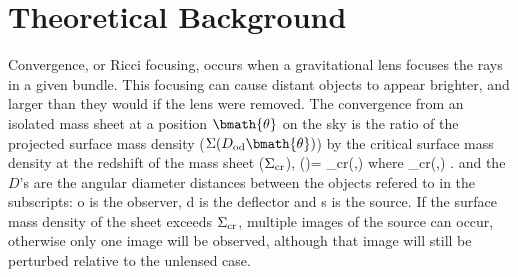 \documentclass[useAMS,usenatbib]{mn2e}
\begin{document}
\section{Theoretical Background}
\label{sec:theory}

Convergence, or Ricci focusing, occurs when a gravitational lens focuses
the rays in a given bundle. This focusing can cause distant objects to
appear brighter, and larger than they would if the lens were removed.
The convergence from an isolated mass sheet at a position
$\bmath{\theta}$ on the sky is the ratio of the projected surface
mass density ($\Sigma(D_{\mathrm{od}}\bmath{\theta})$) \devided by the
critical surface mass density at the redshift of the mass sheet
($\Sigma_{\rm cr}$),
\be
\kappa(\bmath{\theta})= 
                              {\Sigma_{\rm cr}(\zd,\zs)}
\ee
where 
\be 
\label{eq:sigcrit} 
\Sigma_{\rm cr}(\zd,\zs) \equiv {}.
\ee
and the $D$'s are the angular diameter distances between the objects
refered to in the subscripts: o is the observer, d is the deflector and
s is the source. If the surface mass density of the sheet exceeds
$\Sigma_{\rm cr}$, multiple images of the source can occur, otherwise
only one image will be observed, although that image will still be
perturbed relative to the unlensed case.

\end{document}
